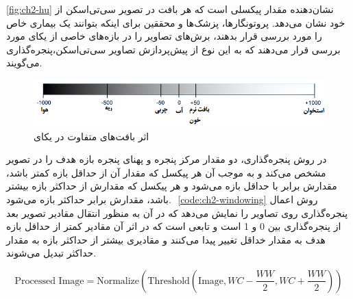 \autoref{fig:ch2-hu}
نشان‌دهنده مقدار پیکسلی است که هر بافت در تصویر سی‌تی‌اسکن از خود نشان می‌دهد. پروتونگارها،‌ پزشک‌ها و محققین برای اینکه بتوانند یک بیماری خاص را مورد بررسی قرار بدهند، برش‌های تصاویر را در بازه‌های خاصی از یکای
مورد بررسی قرار می‌دهند که به این نوع از پیش‌پردازش تصاویر سی‌تی‌اسکن،‌پنجره‌گذاری
می‌گویند. 
\begin{figure}[H]
\centering
\includegraphics[width=1.0\linewidth]{Images/Chapter2/HU}
\caption{اثر بافت‌های متفاوت در یکای
 \cite{kaggleCTScansDICOM}}
\label{fig:ch2-hu}
\end{figure}

در روش پنجره‌گذاری، دو مقدار مرکز پنجره
و پهنای پنجره
بازه هدف را در تصویر مشخص می‌کند و به موجب آن هر پیکسل که مقدار آن از حداقل بازه کمتر باشد، مقدارش برابر با حداقل بازه می‌شود و هر پیکسل که مقدارش از حداکثر بازه بیشتر باشد، مقدارش برابر حداکثر بازه می‌شود. ‎
\autoref{code:ch2-windowing}
روش اعمال پنجره‌گذاری روی تصاویر را نمایش می‌دهد که در آن 
به منظور انتقال مقادیر تصویر بعد از پنجره‌گذاری بین 0 و 1 است و 
تابعی است که در اثر آن مقادیر کمتر از حداقل بازه هدف به مقدار خداقل تغییر پیدا می‌کنند و مقادیری بیشتر از حداکثر بازه به مقدار حداکثر تبدیل می‌شوند.   
\begin{latin}
\begin{equation}
\text{Processed Image} = \text{Normalize}(\text{Threshold}(\text{Image}, WC-\frac{WW}{2},WC+\frac{WW}{2})) 
\end{equation}
\label{code:ch2-windowing}
\end{latin}

